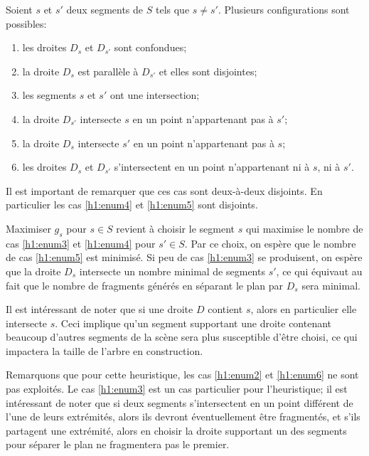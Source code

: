 Soient $s$ et $s'$ deux segments de $S$ tels que $s \ne s'$.
Plusieurs configurations sont possibles:
\begin{enumerate}
\item les droites  $D_s$ et  $D_{s'}$ sont confondues; \label{h1:enum1}
\item la droite $D_s$ est parallèle à $D_{s'} $ et elles sont disjointes; \label{h1:enum2}
\item les segments $s$ et $s'$ ont une intersection; \label{h1:enum3}
\item la droite $D_{s'}$ intersecte $s$ en un point
  n'appartenant pas à $s'$;\label{h1:enum4}
\item la droite $D_{s}$ intersecte $s'$ en un point
  n'appartenant pas à $s$; \label{h1:enum5}
\item les droites $D_s$ et $D_{s'}$ s'intersectent en un point n'appartenant ni
  à $s$, ni à $s'$. \label{h1:enum6}
\end{enumerate}

Il est important de remarquer que ces cas sont deux-à-deux disjoints.
En particulier les cas \ref{h1:enum4} et \ref{h1:enum5} sont disjoints.

Maximiser $g_s$ pour $s \in S$ revient à choisir le segment $s$ qui maximise
le nombre de cas \ref{h1:enum3} et \ref{h1:enum4} pour $s' \in S$.
Par ce choix, on espère que le nombre de cas \ref{h1:enum5} est minimisé.
Si peu de cas \ref{h1:enum3} se produisent, on espère que la droite $D_s$ intersecte un
nombre minimal de segments $s'$, ce qui équivaut au fait que le
nombre de fragments générés en séparant le plan par $D_s$ sera minimal.
 


Il est intéressant de noter que si une droite $D$ contient $s$, alors
en particulier elle intersecte $s$. Ceci implique qu'un segment supportant
une droite contenant beaucoup d'autres segments de la scène sera plus
susceptible d'être choisi, ce qui impactera la taille de l'arbre en construction.

Remarquons que pour cette heuristique, les cas \ref{h1:enum2} et
\ref{h1:enum6} ne sont pas exploités.
Le cas \ref{h1:enum3} est un cas particulier pour l'heuristique;
il est intéressant de noter que si deux segments s'intersectent
en un point différent de l'une de leurs extrémités, alors ils devront
éventuellement être fragmentés, et s'ils partagent une extrémité, alors
en choisir la droite supportant un des segments pour séparer le plan ne
fragmentera pas le premier.

